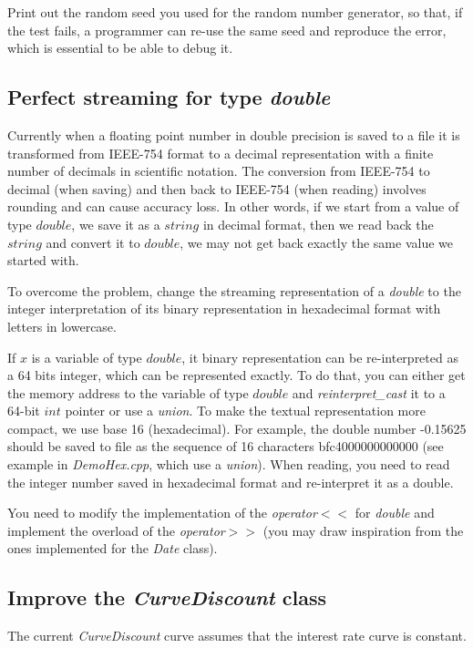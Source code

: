 \documentclass[10pt]{article}
\begin{document}
Print out the random seed you used for the random number generator, so that, if the test fails, a programmer can re-use the same seed and reproduce the error, which is essential to be able to debug it.

\subsection{Perfect streaming for type \textit{double}}
Currently when a floating point number in double precision is saved to a file it is transformed from IEEE-754 format to a decimal representation with a finite number of decimals in scientific notation. The conversion from IEEE-754 to decimal (when saving) and then back to IEEE-754 (when reading) involves rounding and can cause accuracy loss. In other words, if we start from a value of type $double$, we save it as a $string$ in decimal format, then we read back the $string$ and convert it to $double$, we may not get back exactly the same value we started with.

To overcome the problem, change the streaming representation of a \textit{double} to the integer interpretation of its binary representation in hexadecimal format with letters in lowercase.

If $x$ is a variable of type $double$, it binary representation can be re-interpreted as a 64 bits integer, which can be represented exactly. To do that,
you can either get the memory address to the variable of type $double$ and \textit{reinterpret\_cast} it to a 64-bit $int$ pointer or use a \textit{union}. To make the textual representation more compact, we use base 16 (hexadecimal). For example, the double number -0.15625 should be saved to file as the sequence of 16 characters bfc4000000000000 (see example in \textit{DemoHex.cpp}, which use a \textit{union}). When reading, you need to read the integer number saved in hexadecimal format and re-interpret it as a double.

You need to modify the implementation of the \textit{operator$<<$} for \textit{double} and implement the overload of the \textit{operator$>>$} (you may draw inspiration from the ones implemented for the \textit{Date} class).

\subsection{Improve the \textit{CurveDiscount} class}
The current \textit{CurveDiscount} curve assumes that the interest rate curve is constant.
\end{document}
